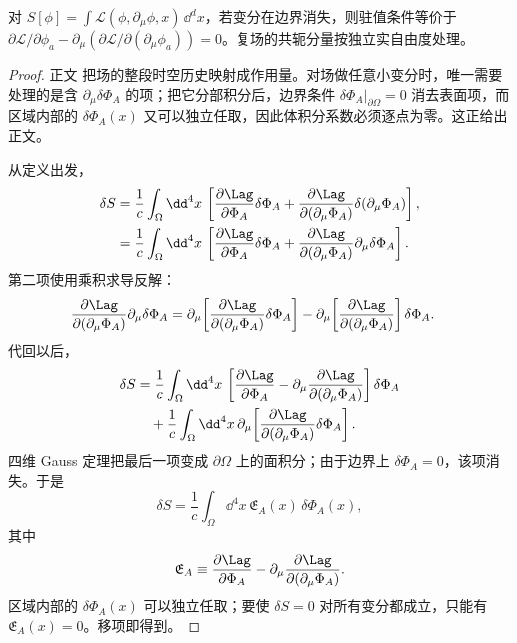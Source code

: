 \begin{theorem}
对 $S[\phi]=\int\mathcal L(\phi,\partial_\mu\phi,x)\,\dd^dx$，若变分在边界消失，则驻值条件等价于 $\partial\mathcal L/\partial\phi_a-\partial_\mu(\partial\mathcal L/\partial(\partial_\mu\phi_a))=0$。复场的共轭分量按独立实自由度处理。
\end{theorem}
\begin{proof}
正文 把场的整段时空历史映射成作用量。对场做任意小变分时，唯一需要处理的是含 $\partial_\mu\delta\Phi_A$ 的项；把它分部积分后，边界条件 $\delta\Phi_A|_{\partial\Omega}=0$ 消去表面项，而区域内部的 $\delta\Phi_A(x)$ 又可以独立任取，因此体积分系数必须逐点为零。这正给出正文。

从定义出发，
\begin{align*}
 \delta S
 &=\frac1c\int_\Omega\dd^4 x\,
 \left[
 \frac{\partial\Lag}{\partial\Phi_A}\delta\Phi_A
 +\frac{\partial\Lag}{\partial(\partial_\mu\Phi_A)}
 \delta(\partial_\mu\Phi_A)
 \right],\\
 &=\frac1c\int_\Omega\dd^4 x\,
 \left[
 \frac{\partial\Lag}{\partial\Phi_A}\delta\Phi_A
 +\frac{\partial\Lag}{\partial(\partial_\mu\Phi_A)}
 \partial_\mu\delta\Phi_A
 \right].
\end{align*}
第二项使用乘积求导反解：
\begin{align*}
 \frac{\partial\Lag}{\partial(\partial_\mu\Phi_A)}
 \partial_\mu\delta\Phi_A
 &=\partial_\mu\!\left[
 \frac{\partial\Lag}{\partial(\partial_\mu\Phi_A)}
 \delta\Phi_A\right]
 -\partial_\mu\!\left[
 \frac{\partial\Lag}{\partial(\partial_\mu\Phi_A)}\right]
 \delta\Phi_A.
\end{align*}
代回以后，
\begin{align*}
 \delta S
 &=\frac1c\int_\Omega\dd^4 x\,
 \left[
 \frac{\partial\Lag}{\partial\Phi_A}
 -\partial_\mu\frac{\partial\Lag}{\partial(\partial_\mu\Phi_A)}
 \right]\delta\Phi_A\\
 &\quad+\frac1c\int_\Omega\dd^4 x\,
 \partial_\mu\!\left[
 \frac{\partial\Lag}{\partial(\partial_\mu\Phi_A)}
 \delta\Phi_A\right].
\end{align*}
四维 Gauss 定理把最后一项变成 $\partial\Omega$ 上的面积分；由于边界上 $\delta\Phi_A=0$，该项消失。于是
\begin{equation*}
 \delta S
 =\frac1c\int_\Omega\dd^4 x\,
 \mathfrak E_A(x)\,\delta\Phi_A(x),
\end{equation*}
其中
\begin{equation*}
 \mathfrak E_A
 \equiv
 \frac{\partial\Lag}{\partial\Phi_A}
 -\partial_\mu\frac{\partial\Lag}{\partial(\partial_\mu\Phi_A)}.
\end{equation*}
区域内部的 $\delta\Phi_A(x)$ 可以独立任取；要使 $\delta S=0$ 对所有变分都成立，只能有 $\mathfrak E_A(x)=0$。移项即得到。
\end{proof}

